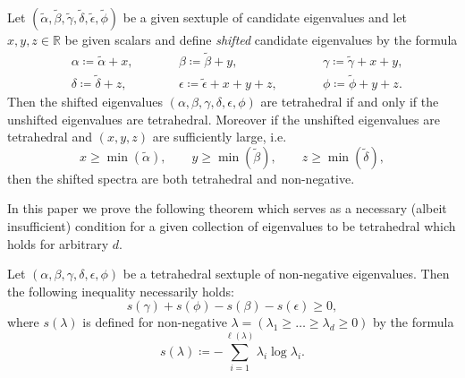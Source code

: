 \documentclass[notitlepage, 10pt]{article}
\begin{document}
\begin{lem}
    Let $(\tilde \alpha, \tilde \beta, \tilde \gamma, \tilde \delta, \tilde \epsilon, \tilde \phi)$ be a given sextuple of candidate eigenvalues and let $x,y,z \in \mathbb R$ be given scalars and define \textit{shifted} candidate eigenvalues by the formula
    \begin{equation}
        \label{eq:shifted_tetrahedral_eigenvalues}
        \begin{alignedat}{3}
            &\alpha \coloneqq \tilde \alpha + x, \qquad
            &&\beta \coloneqq \tilde \beta + y, \qquad
            &&\gamma \coloneqq \tilde \gamma + x+y, \\
            &\delta \coloneqq \tilde \delta + z, \qquad
            &&\epsilon \coloneqq \tilde \epsilon + x + y + z, \qquad
            &&\phi \coloneqq \tilde \phi + y + z.
        \end{alignedat}
    \end{equation}
    Then the shifted eigenvalues $(\alpha,\beta,\gamma,\delta,\epsilon,\phi)$ are tetrahedral if and only if the unshifted eigenvalues are tetrahedral.
    Moreover if the unshifted eigenvalues are tetrahedral and $(x,y,z)$ are sufficiently large, i.e.
    \begin{equation}
        x \geq \min(\tilde \alpha), \qquad
        y \geq \min(\tilde \beta), \qquad
        z \geq \min(\tilde \delta),
    \end{equation}
    then the shifted spectra are both tetrahedral and non-negative.
\end{lem}

In this paper we prove the following theorem which serves as a necessary (albeit insufficient) condition for a given collection of eigenvalues to be tetrahedral which holds for arbitrary $d$.
\begin{thm}
    \label{thm:SSA}
    Let $(\alpha,\beta,\gamma,\delta,\epsilon,\phi)$ be a tetrahedral sextuple of non-negative eigenvalues.
    Then the following inequality necessarily holds:
    \begin{equation}
        \label{eq:SSA_like_ineq}
        s(\gamma) + s(\phi) - s(\beta) - s(\epsilon) \geq 0,
    \end{equation}
    where $s(\lambda)$ is defined for non-negative $\lambda = (\lambda_1 \geq \ldots \geq \lambda_{d} \geq 0)$ by the formula
    \begin{equation}
        \label{eq:unnorm_shannon_intro}
        s(\lambda) \coloneqq -\sum_{i=1}^{\ell(\lambda)} \lambda_i \log \lambda_i.
    \end{equation}
\end{thm}
\end{document}
